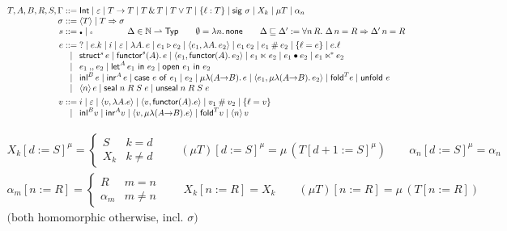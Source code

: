 \documentclass[10pt]{article}
\newcommand{\Int}{\mathsf{Int}}
\newcommand{\tp}{\varepsilon}
\newcommand{\bra}[1]{\alpha_{#1}}
\newcommand{\mrg}{\mathbin{\#}}
\newcommand{\qry}{{?}}
\newcommand{\bx}{\mathbin{\triangleright}}
\newcommand{\subs}[3]{#1[#2{:=}#3]}
\newcommand{\wrp}[2]{\langle #1\rangle\,#2}
\newcommand{\sealE}[4]{\mathsf{seal}\;#1\;#2\;#3\;#4}
\newcommand{\unsealE}[4]{\mathsf{unseal}\;#1\;#2\;#3\;#4}
\newcommand{\storele}{\sqsubseteq}
\newcommand{\sbx}{{\scriptscriptstyle\bullet}}
\newcommand{\opn}{{\scriptscriptstyle\circ}}
\begin{document}
\[
\begin{array}{r@{\;}c@{\;}l}
T, A, B, R, S, \Gamma &::=& \Int \mid \tp \mid T \to T \mid T \,\&\, T \mid T \vee T \mid \{\ell : T\} \mid \mathsf{sig}\ \sigma \mid X_k \mid \mu T \mid \bra{n} \\
\sigma &::=& \langle T \rangle \mid T \Rightarrow \sigma \\
s &::=& \sbx \mid \opn \qquad\qquad \Delta \in \mathbb{N} \rightharpoonup \mathsf{Typ} \qquad \emptyset = \lambda n.\,\mathsf{none} \qquad \Delta \storele \Delta' := \forall n\,R.\ \Delta\,n = R \Rightarrow \Delta'\,n = R \\[4pt]
e &::=& \qry \mid e.k \mid i \mid \tp \mid \lambda A.\,e \mid e_1 \bx e_2 \mid \langle e_1, \lambda A.\,e_2 \rangle \mid e_1\,e_2
       \mid e_1 \mrg e_2 \mid \{\ell = e\} \mid e.\ell \\
  &\mid& \mathsf{struct}^{s}\,e \mid \mathsf{functor}^{s}(A).\,e \mid \langle e_1, \mathsf{functor}(A).\,e_2 \rangle \mid e_1 \ltimes e_2 \mid e_1 \bullet e_2 \mid e_1 \ltimes^{\!*} e_2 \\
  &\mid& e_1 \mathbin{,\!,} e_2 \mid \mathsf{let}^{A}\,e_1\ \mathsf{in}\ e_2 \mid \mathsf{open}\ e_1\ \mathsf{in}\ e_2 \\
  &\mid& \mathsf{inl}^{B}\,e \mid \mathsf{inr}^{A}\,e \mid \mathsf{case}\ e\ \mathsf{of}\ e_1 \mid e_2
       \mid \mu\lambda(A{\to}B).\,e \mid \langle e_1, \mu\lambda(A{\to}B).\,e_2 \rangle \mid \mathsf{fold}^{T} e \mid \mathsf{unfold}\ e \\
  &\mid& \wrp{n}{e} \mid \sealE{n}{R}{S}{e} \mid \unsealE{n}{R}{S}{e} \\[4pt]
v &::=& i \mid \tp \mid \langle v, \lambda A.e \rangle \mid \langle v, \mathsf{functor}(A).e \rangle \mid v_1 \mrg v_2 \mid \{\ell = v\} \\
  &\mid& \mathsf{inl}^{B} v \mid \mathsf{inr}^{A} v \mid \langle v, \mu\lambda(A{\to}B).e\rangle \mid \mathsf{fold}^{T} v \mid \wrp{n}{v}
\end{array}
\]

\[
\begin{array}{l}
\subs{X_k}{d}{S}^{\mu} = \begin{cases} S & k = d \\ X_k & k \neq d \end{cases} \qquad
\subs{(\mu T)}{d}{S}^{\mu} = \mu\,(\subs{T}{d{+}1}{S}^{\mu}) \qquad
\subs{\bra{n}}{d}{S}^{\mu} = \bra{n} \\[3pt]
\subs{\bra{m}}{n}{R} = \begin{cases} R & m = n \\ \bra{m} & m \neq n \end{cases} \qquad
\subs{X_k}{n}{R} = X_k \qquad
\subs{(\mu T)}{n}{R} = \mu\,(\subs{T}{n}{R}) \\[3pt]
\text{(both homomorphic otherwise, incl.\ }\sigma\text{)}
\end{array}
\]
\end{document}
